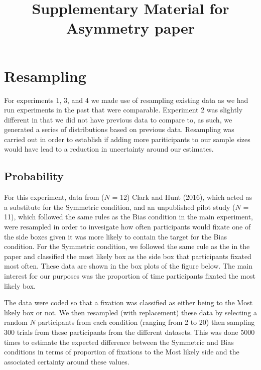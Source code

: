 \documentclass[
]{article}
\title{Supplementary Material for Asymmetry paper}
\author{}
\date{\vspace{-2.5em}}
\begin{document}
\maketitle

{
\setcounter{tocdepth}{2}
\tableofcontents
}
\hypertarget{resampling}{%
\section{Resampling}\label{resampling}}

For experiments 1, 3, and 4 we made use of resampling existing data as we had run experiments in the past that were comparable. Experiment 2 was slightly different in that we did not have previous data to compare to, as such, we generated a series of distributions based on previous data. Resampling was carried out in order to establish if adding more pariticipants to our sample sizes would have lead to a reduction in uncertainty around our estimates.

\hypertarget{probability}{%
\subsection{Probability}\label{probability}}

For this experiment, data from (\(N\) = 12) Clark and Hunt (2016), which acted as a substitute for the Symmetric condition, and an unpublished pilot study (\(N\) = 11), which followed the same rules as the Bias condition in the main experiment, were resampled in order to invesigate how often participants would fixate one of the side boxes given it was more likely to contain the target for the Bias condition. For the Symmetric condition, we followed the same rule as the in the paper and classified the most likely box as the side box that participants fixated most often. These data are shown in the box plots of the figure below. The main interest for our purposes was the proportion of time participants fixated the most likely box.

The data were coded so that a fixation was classified as either being to the Most likely box or not. We then resampled (with replacement) these data by selecting a random \(N\) participants from each condition (ranging from 2 to 20) then sampling 300 trials from these participants from the different datasets. This was done 5000 times to estimate the expected difference between the Symmetric and Bias conditions in terms of proportion of fixations to the Most likely side and the associated certainty around these values.
\end{document}
